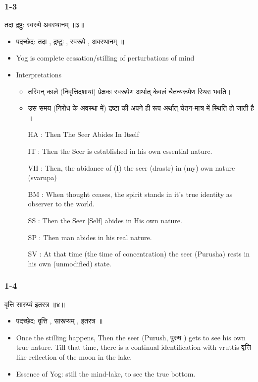\begin{frame}[fragile]\frametitle{1-3}

\begin{sanskrit}
तदा द्रष्टु: स्वरुपे अवस्थानम् ॥३॥
\end{sanskrit}


	\begin{itemize}
	\item पदच्छेद: तदा , द्रष्टुः , स्वरूपे , अवस्थानम् ॥

	\item Yog is complete cessation/stilling of perturbations of mind
	\item Interpretations
		\begin{itemize}	
		\item  तस्मिन् काले (निवृत्तिदशायां) प्रेक्षकः स्वरूपेण अर्थात् केवलं चैतन्यरूपेण स्थिरः भवति।
		\item उस समय (निरोध के अवस्था में) द्रष्टा की अपने ही रूप अर्थात् चेतन-मात्र में स्थिति हो जाती है ।		
		\item [HA]: Then The Seer Abides In Itself
		\item [IT]: Then the Seer is established in his own essential nature.
		\item [VH]: Then, the abidance of (I) the seer (drastr) in (my) own nature (svarupa)
		\item [BM]: When thought ceases, the spirit stands in it’s true identity as observer to the world.
		\item [SS]: Then the Seer [Self] abides in His own nature.
		\item [SP]: Then man abides in his real nature.
		\item [SV]: At that time (the time of concentration) the seer (Purusha) rests in his own (unmodified) state.	
		\end{itemize}
	\end{itemize}

\end{frame}

\begin{frame}[fragile]\frametitle{1-4}

\begin{sanskrit}
वृत्ति सारुप्यं इतरत्र ॥४॥
\end{sanskrit}


	\begin{itemize}
	\item पदच्छेद: वृत्ति , सारूप्यम् , इतरत्र ॥
	\item Once the stilling happens, Then the seer (Purush, पुरुष ) gets to see his own true nature. Till that time, there is a continual identification with vruttis वृत्ति like reflection of the moon in the lake.
	\item Essence of Yog: still the mind-lake, to see the true bottom.

	\end{itemize}

\end{frame}


